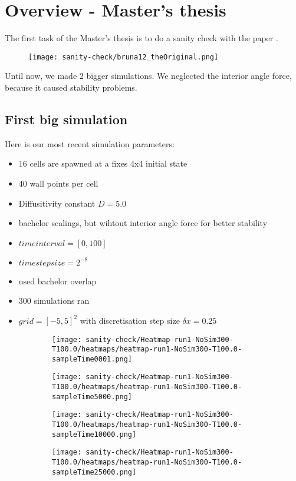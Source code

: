 \section*{Overview - Master's thesis }
The first task of the Master's thesis is to do a sanity check with the paper \cite{Bruna2012}. 
\begin{figure}[h!]
	\centering
	\hfill
	\texttt{[image: sanity-check/bruna12\_theOriginal.png]}
\end{figure}
Until now, we made 2 bigger simulations. We neglected the interior angle force, because it caused stability problems. 

\newpage
\subsection*{First big simulation}
Here is our most recent simulation parameters:
\begin{itemize}
    \item 16 cells are spawned at a fixes 4x4 initial state 
    \item 40 wall points per cell 
    \item Diffusitivity constant $D=5.0$
    \item bachelor scalings, but wihtout interior angle force for better stability
    \item $time interval = [0, 100]$
    \item $time step size = 2^{-8}$
    \item used bachelor overlap 
    \item 300 simulations ran 
    \item $grid = [-5,5]^2$ with discretisation step size $\delta x = 0.25$
\end{itemize}

\begin{figure}[h!]
	\centering
	\begin{subfigure}{0.4\textwidth}
		\texttt{[image: sanity-check/Heatmap-run1-NoSim300-T100.0/heatmaps/heatmap-run1-NoSim300-T100.0-sampleTime0001.png]}
	\end{subfigure}
	\hfill
	\begin{subfigure}{0.4\textwidth}
		\texttt{[image: sanity-check/Heatmap-run1-NoSim300-T100.0/heatmaps/heatmap-run1-NoSim300-T100.0-sampleTime5000.png]}
	\end{subfigure}
	\hfill
	\begin{subfigure}{0.4\textwidth}
		\texttt{[image: sanity-check/Heatmap-run1-NoSim300-T100.0/heatmaps/heatmap-run1-NoSim300-T100.0-sampleTime10000.png]}
	\end{subfigure}\hfill
	\begin{subfigure}{0.4\textwidth}
		\texttt{[image: sanity-check/Heatmap-run1-NoSim300-T100.0/heatmaps/heatmap-run1-NoSim300-T100.0-sampleTime25000.png]}
	\end{subfigure}
	\label{fig:model_illus}
\end{figure}


